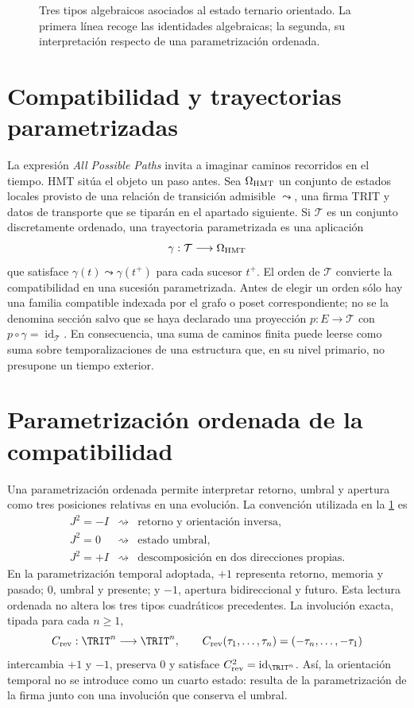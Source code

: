\begin{figure}[H]
\centering
\resizebox{\textwidth}{!}{}
\caption{Tres tipos algebraicos asociados al estado ternario orientado. La
primera línea recoge las identidades algebraicas; la segunda, su interpretación
respecto de una parametrización ordenada.}
\label{fig:trit-atlas}
\end{figure}

\section{Compatibilidad y trayectorias parametrizadas}

La expresión \emph{All Possible Paths} invita a imaginar caminos recorridos en
el tiempo. HMT sitúa el objeto un paso antes. Sea \(\Omega_{\rm HMT}\) un
conjunto de estados locales provisto de una relación de transición admisible
\(\leadsto\), una firma TRIT y datos de transporte que se tiparán en el
apartado siguiente. Si
\(\mathcal T\) es un conjunto discretamente ordenado, una trayectoria
parametrizada es una aplicación
\[
\gamma:\mathcal T\longrightarrow\Omega_{\rm HMT}
\]
que satisface \(\gamma(t)\leadsto\gamma(t^+)\) para cada sucesor \(t^+\).
El orden de \(\mathcal T\) convierte la compatibilidad en una sucesión
parametrizada. Antes de elegir un orden sólo hay una familia compatible
indexada por el grafo o poset correspondiente; no se la denomina sección salvo
que se haya declarado una proyección \(p:E\to\mathcal T\) con
\(p\circ\gamma=\operatorname{id}_{\mathcal T}\).
En consecuencia, una suma de caminos finita puede leerse como suma sobre
temporalizaciones de una estructura que, en su nivel primario, no presupone
un tiempo exterior.

\section{Parametrización ordenada de la compatibilidad}

Una parametrización ordenada permite interpretar retorno, umbral y apertura
como tres posiciones relativas en una evolución. La convención utilizada en la
\cref{fig:trit-atlas} es
\[
\begin{array}{ccl}
J^2=-I&\rightsquigarrow&\text{retorno y orientación inversa},\\
J^2=0&\rightsquigarrow&\text{estado umbral},\\
J^2=+I&\rightsquigarrow&\text{descomposición en dos direcciones propias}.
\end{array}
\]
En la parametrización temporal adoptada, \(+1\) representa
retorno, memoria y pasado; \(0\), umbral y presente; y \(-1\), apertura
bidireccional y futuro. Esta lectura ordenada no altera los tres tipos
cuadráticos precedentes.
La involución exacta, tipada para cada \(n\geq1\),
\[
C_{\rm rev}:\TRIT^n\longrightarrow\TRIT^n,
\qquad
C_{\rm rev}(\tau_1,\ldots,\tau_n)=(-\tau_n,\ldots,-\tau_1)
\]
intercambia \(+1\) y \(-1\), preserva \(0\) y satisface
\(C_{\rm rev}^2=\operatorname{id}_{\TRIT^n}\).
Así, la orientación temporal no se introduce como un cuarto estado: resulta
de la parametrización de la firma junto con una involución que conserva el
umbral.

